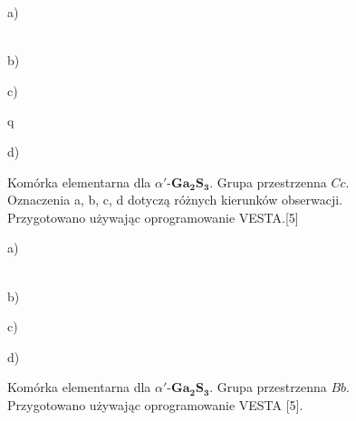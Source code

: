 \begin{enumerate}
	\begin{figure}[H]
		\begin{minipage}[h]{0.47\linewidth}
			 a) \\
		\end{minipage}
		\hfill
		\begin{minipage}[h]{0.47\linewidth}
			 \\b)
		\end{minipage}
		\vfill
		\begin{minipage}[h]{0.47\linewidth}
			 c) \\
		\end{minipage}q
		\hfill
		\begin{minipage}[h]{0.47\linewidth}
			 d) \\
		\end{minipage}
		\caption{Komórka elementarna dla $\alpha'$-$\mathbf{Ga_{2}S_{3}}$. Grupa przestrzenna $Cc$. Oznaczenia a, b, c, d dotyczą różnych kierunków obserwacji. Przygotowano używając oprogramowanie VESTA.[5]}
		\begin{minipage}[h]{0.47\linewidth}
			 a) \\
		\end{minipage}
		\hfill
		\begin{minipage}[h]{0.47\linewidth}
			 \\b)
		\end{minipage}
		\vfill
		\begin{minipage}[h]{0.47\linewidth}
			 c) \\
		\end{minipage}
		\hfill
		\begin{minipage}[h]{0.47\linewidth}
			 d) \\
		\end{minipage}
		\caption{Komórka elementarna dla $\alpha'$-$\mathbf{Ga_{2}S_{3}}$. Grupa przestrzenna $Bb$. Przygotowano używając oprogramowanie VESTA [5].}
	\end{figure}
	

\end{enumerate}
